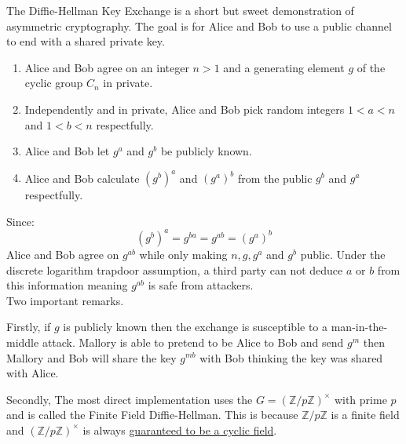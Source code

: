 
The Diffie-Hellman Key Exchange is a short but sweet demonstration of asymmetric cryptography.
The goal is for Alice and Bob to use a public channel to end with a shared private key.

\begin{enumerate}
\item Alice and Bob agree on an integer $n>1$ and a generating element $g$ of the cyclic group $C_n$ in private. 
\item Independently and in private,
Alice and Bob pick random integers $1<a<n$ and $1<b<n$ respectfully.
\item Alice and Bob let $g^a$ and $g^b$ be publicly known.
\item Alice and Bob calculate $(g^b)^a$ and $(g^a)^b$ from the public $g^b$ and $g^a$ respectfully.
\end{enumerate}

Since:
\[(g^b)^a = g^{ba} = g^{ab} = (g^a)^b\]
Alice and Bob agree on $g^{ab}$ while only making $n,g,g^a$ and $g^b$ public.
Under the discrete logarithm trapdoor assumption, 
a third party can not deduce $a$ or $b$ from this information meaning $g^{ab}$ is safe from attackers.
\\

Two important remarks.

Firstly,
if $g$ is publicly known then the exchange is susceptible to a man-in-the-middle attack.
Mallory is able to pretend to be Alice to Bob and send $g^m$ then Mallory and Bob will share the key $g^{mb}$ with Bob thinking the key was shared with Alice.

Secondly, 
The most direct implementation uses the $G=(\mathbb{Z}/p\mathbb{Z})^\times$ with prime $p$ and is called the Finite Field Diffie-Hellman.
This is because $\mathbb{Z}/p\mathbb{Z}$ is a finite field and $(\mathbb{Z}/p\mathbb{Z})^\times$ is always 
\hyperref[appx:cycle-multiplicative-group]{guaranteed to be a cyclic field}.
